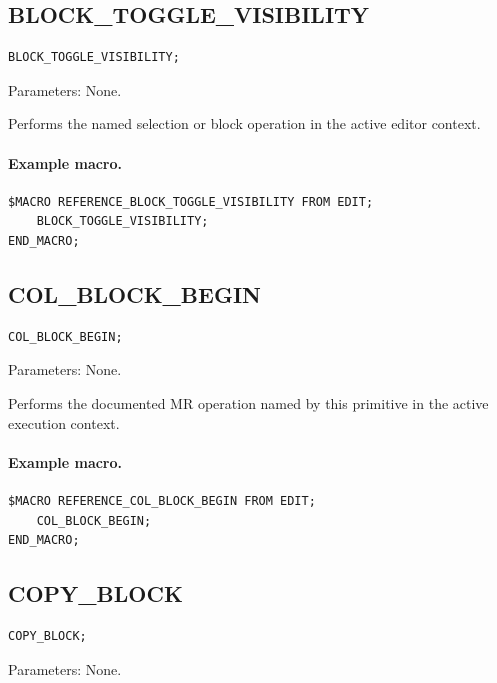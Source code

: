 \documentclass[a4paper,10pt,twoside,openany]{book}
\newenvironment{mrmacextension}{\begin{changebar}}{\end{changebar}}
\begin{document}
\begin{mrmacextension}
\label{prim:procedure-block-toggle-visibility}
\subsection*{BLOCK\_TOGGLE\_VISIBILITY}
\begin{verbatim}
BLOCK_TOGGLE_VISIBILITY;
\end{verbatim}
Parameters: None.

Performs the named selection or block operation in the active editor context.

\paragraph{Example macro.}
\begin{verbatim}
$MACRO REFERENCE_BLOCK_TOGGLE_VISIBILITY FROM EDIT;
    BLOCK_TOGGLE_VISIBILITY;
END_MACRO;
\end{verbatim}
\end{mrmacextension}

\label{prim:procedure-col-block-begin}
\subsection*{COL\_BLOCK\_BEGIN}
\begin{verbatim}
COL_BLOCK_BEGIN;
\end{verbatim}
Parameters: None.

Performs the documented MR operation named by this primitive in the active execution context.

\paragraph{Example macro.}
\begin{verbatim}
$MACRO REFERENCE_COL_BLOCK_BEGIN FROM EDIT;
    COL_BLOCK_BEGIN;
END_MACRO;
\end{verbatim}

\label{prim:procedure-copy-block}
\subsection*{COPY\_BLOCK}
\begin{verbatim}
COPY_BLOCK;
\end{verbatim}
Parameters: None.
\end{document}
